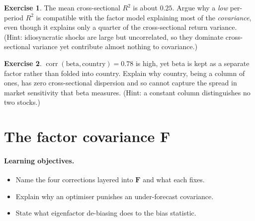 \documentclass[11pt]{article}
\theoremstyle{definition}
\newtheorem{exercise}{Exercise}[section]
\theoremstyle{plain}
\theoremstyle{remark}
\DeclareMathOperator{\Corr}{corr}
\newcommand{\Fmat}{\mathbf{F}}
\begin{document}
\begin{exercise}
The mean cross-sectional $R^2$ is about $0.25$. Argue why a \emph{low} per-period $R^2$ is compatible with the factor model explaining most of the \emph{covariance}, even though it explains only a quarter of the cross-sectional return variance. (Hint: idiosyncratic shocks are large but uncorrelated, so they dominate cross-sectional variance yet contribute almost nothing to covariance.)
\end{exercise}

\begin{exercise}
$\Corr(\text{beta},\text{country})=0.78$ is high, yet beta is kept as a separate factor rather than folded into country. Explain why country, being a column of ones, has zero cross-sectional dispersion and so cannot capture the spread in market sensitivity that beta measures. (Hint: a constant column distinguishes no two stocks.)
\end{exercise}

\section{The factor covariance \texorpdfstring{$\Fmat$}{F}}\label{sec:fcov}

\paragraph{Learning objectives.}
\begin{itemize}[leftmargin=1.4em,nosep]
  \item Name the four corrections layered into $\Fmat$ and what each fixes.
  \item Explain why an optimiser punishes an under-forecast covariance.
  \item State what eigenfactor de-biasing does to the bias statistic.
\end{itemize}
\end{document}
